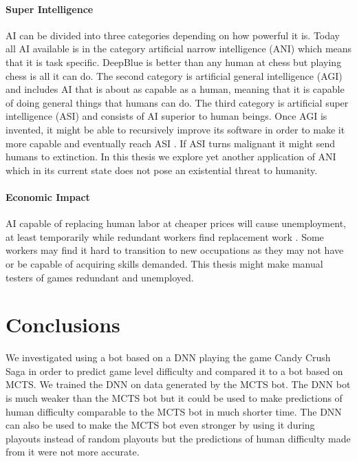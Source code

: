 \documentclass{kththesis}
\begin{document}
\subsubsection{Super Intelligence}
AI can be  divided into three categories  depending on how powerful it is. Today all AI available is in the category artificial narrow intelligence (ANI) which means that it is task specific. DeepBlue is better than any human at chess but playing chess is all it can do. The second category is artificial general intelligence (AGI) and  includes AI that is about as capable as a human, meaning that it is capable of doing general things that humans can do. The third category is  artificial super intelligence (ASI) and  consists of AI superior to human beings. Once AGI is invented, it might be able to recursively improve its software in order to make it more capable and eventually reach ASI \cite{bostrom1998long}. If ASI turns malignant it might send humans to extinction. In this thesis we explore yet another application of ANI which in its current state does not pose an existential threat to humanity.

\subsubsection{Economic Impact}
AI capable of replacing human labor  at cheaper prices will cause unemployment, at least temporarily while redundant workers  find replacement work \cite{nilsson1984artificial}. Some workers may find it hard to transition to new occupations as they may not have or be capable of acquiring skills demanded. This thesis might make  manual testers of games redundant and unemployed.

\chapter{Conclusions}
We investigated using a bot based on a DNN playing the game Candy Crush Saga in order to predict game level difficulty and compared it to a bot based on MCTS. We trained the DNN on data generated by the MCTS bot. The DNN bot is much weaker than the MCTS bot but it could be used to make predictions of human difficulty comparable to the MCTS bot in much shorter time. The DNN can also be used to make the MCTS bot even stronger by using it during playouts instead of random playouts but the predictions of human difficulty made from it were not more accurate.




\end{document}

